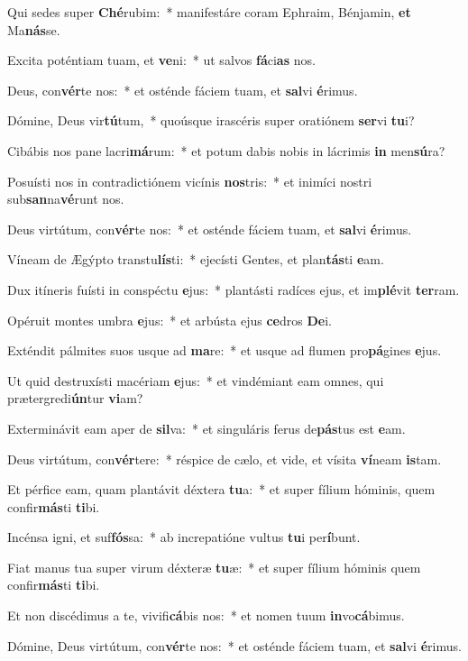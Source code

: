 \item Qui sedes super \textbf{Ché}rubim:~* manifestáre coram Ephraim, Bénjamin, \textbf{et} Ma\textbf{nás}se.
\item Excita poténtiam tuam, et \textbf{ve}ni:~* ut salvos \textbf{fá}ci\textbf{as} nos.
\item Deus, con\textbf{vér}te nos:~* et osténde fáciem tuam, et \textbf{sal}vi \textbf{é}rimus.
\item Dómine, Deus vir\textbf{tú}tum,~* quoúsque irascéris super oratiónem \textbf{ser}vi \textbf{tu}i?
\item Cibábis nos pane lacri\textbf{má}rum:~* et potum dabis nobis in lácrimis \textbf{in} men\textbf{sú}ra?
\item Posuísti nos in contradictiónem vicínis \textbf{nos}tris:~* et inimíci nostri sub\textbf{san}na\textbf{vé}runt nos.
\item Deus virtútum, con\textbf{vér}te nos:~* et osténde fáciem tuam, et \textbf{sal}vi \textbf{é}rimus.
\item Víneam de Ægýpto transtu\textbf{lís}ti:~* ejecísti Gentes, et plan\textbf{tás}ti \textbf{e}am.
\item Dux itíneris fuísti in conspéctu \textbf{e}jus:~* plantásti radíces ejus, et im\textbf{plé}vit \textbf{ter}ram.
\item Opéruit montes umbra \textbf{e}jus:~* et arbústa ejus \textbf{ce}dros \textbf{De}i.
\item Exténdit pálmites suos usque ad \textbf{ma}re:~* et usque ad flumen pro\textbf{pá}gines \textbf{e}jus.
\item Ut quid destruxísti macériam \textbf{e}jus:~* et vindémiant eam omnes, qui prætergredi\textbf{ún}tur \textbf{vi}am?
\item Exterminávit eam aper de \textbf{sil}va:~* et singuláris ferus de\textbf{pás}tus est \textbf{e}am.
\item Deus virtútum, con\textbf{vér}tere:~* réspice de cælo, et vide, et vísita \textbf{ví}neam \textbf{is}tam.
\item Et pérfice eam, quam plantávit déxtera \textbf{tu}a:~* et super fílium hóminis, quem confir\textbf{más}ti \textbf{ti}bi.
\item Incénsa igni, et suf\textbf{fós}sa:~* ab increpatióne vultus \textbf{tu}i per\textbf{í}bunt.
\item Fiat manus tua super virum déxteræ \textbf{tu}æ:~* et super fílium hóminis quem confir\textbf{más}ti \textbf{ti}bi.
\item Et non discédimus a te, vivifi\textbf{cá}bis nos:~* et nomen tuum \textbf{in}vo\textbf{cá}bimus.
\item Dómine, Deus virtútum, con\textbf{vér}te nos:~* et osténde fáciem tuam, et \textbf{sal}vi \textbf{é}rimus.
